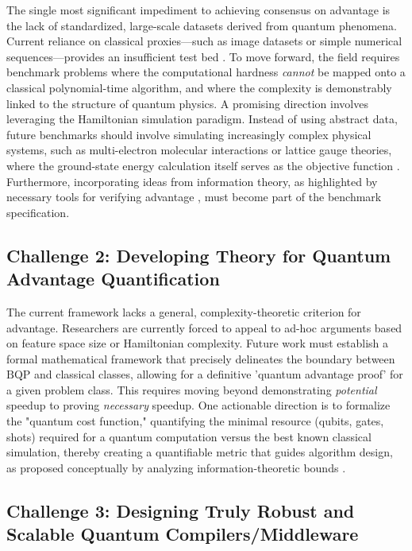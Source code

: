 \documentclass{article}
\begin{document}
The single most significant impediment to achieving consensus on advantage is the lack of standardized, large-scale datasets derived from quantum phenomena. Current reliance on classical proxies---such as image datasets or simple numerical sequences---provides an insufficient test bed \cite{cerezo2022challenges}. To move forward, the field requires benchmark problems where the computational hardness \textit{cannot} be mapped onto a classical polynomial-time algorithm, and where the complexity is demonstrably linked to the structure of quantum physics. A promising direction involves leveraging the Hamiltonian simulation paradigm. Instead of using abstract data, future benchmarks should involve simulating increasingly complex physical systems, such as multi-electron molecular interactions or lattice gauge theories, where the ground-state energy calculation itself serves as the objective function . Furthermore, incorporating ideas from information theory, as highlighted by necessary tools for verifying advantage \cite{liu2024verifying}, must become part of the benchmark specification.

\subsection{Challenge 2: Developing Theory for Quantum Advantage Quantification}

\label{sec:challenge_2\_developing\_theory\_for\_quantu}

The current framework lacks a general, complexity-theoretic criterion for advantage. Researchers are currently forced to appeal to ad-hoc arguments based on feature space size or Hamiltonian complexity. Future work must establish a formal mathematical framework that precisely delineates the boundary between $\text{BQP}$ and classical classes, allowing for a definitive 'quantum advantage proof' for a given problem class. This requires moving beyond demonstrating \textit{potential} speedup to proving \textit{necessary} speedup. One actionable direction is to formalize the "quantum cost function," quantifying the minimal resource (qubits, gates, shots) required for a quantum computation versus the best known classical simulation, thereby creating a quantifiable metric that guides algorithm design, as proposed conceptually by analyzing information-theoretic bounds \cite{huang2021informationtheoretic}.

\subsection{Challenge 3: Designing Truly Robust and Scalable Quantum Compilers/Middleware}
\end{document}
